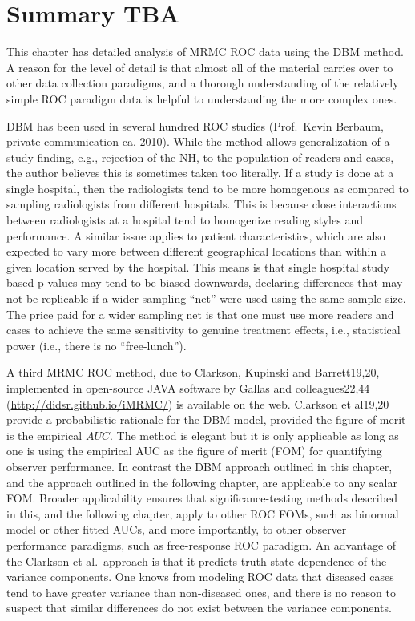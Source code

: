 \documentclass[
]{book}
\begin{document}
\hypertarget{DBMAnalysisBkgrnd-summary}{%
\section{Summary TBA}\label{DBMAnalysisBkgrnd-summary}}

This chapter has detailed analysis of MRMC ROC data using the DBM method. A reason for the level of detail is that almost all of the material carries over to other data collection paradigms, and a thorough understanding of the relatively simple ROC paradigm data is helpful to understanding the more complex ones.

DBM has been used in several hundred ROC studies (Prof.~Kevin Berbaum, private communication ca. 2010). While the method allows generalization of a study finding, e.g., rejection of the NH, to the population of readers and cases, the author believes this is sometimes taken too literally. If a study is done at a single hospital, then the radiologists tend to be more homogenous as compared to sampling radiologists from different hospitals. This is because close interactions between radiologists at a hospital tend to homogenize reading styles and performance. A similar issue applies to patient characteristics, which are also expected to vary more between different geographical locations than within a given location served by the hospital. This means is that single hospital study based p-values may tend to be biased downwards, declaring differences that may not be replicable if a wider sampling ``net'' were used using the same sample size. The price paid for a wider sampling net is that one must use more readers and cases to achieve the same sensitivity to genuine treatment effects, i.e., statistical power (i.e., there is no ``free-lunch'').

A third MRMC ROC method, due to Clarkson, Kupinski and Barrett19,20, implemented in open-source JAVA software by Gallas and colleagues22,44 (\url{http://didsr.github.io/iMRMC/}) is available on the web. Clarkson et al19,20 provide a probabilistic rationale for the DBM model, provided the figure of merit is the empirical \(AUC\). The method is elegant but it is only applicable as long as one is using the empirical AUC as the figure of merit (FOM) for quantifying observer performance. In contrast the DBM approach outlined in this chapter, and the approach outlined in the following chapter, are applicable to any scalar FOM. Broader applicability ensures that significance-testing methods described in this, and the following chapter, apply to other ROC FOMs, such as binormal model or other fitted AUCs, and more importantly, to other observer performance paradigms, such as free-response ROC paradigm. An advantage of the Clarkson et al.~approach is that it predicts truth-state dependence of the variance components. One knows from modeling ROC data that diseased cases tend to have greater variance than non-diseased ones, and there is no reason to suspect that similar differences do not exist between the variance components.
\end{document}

